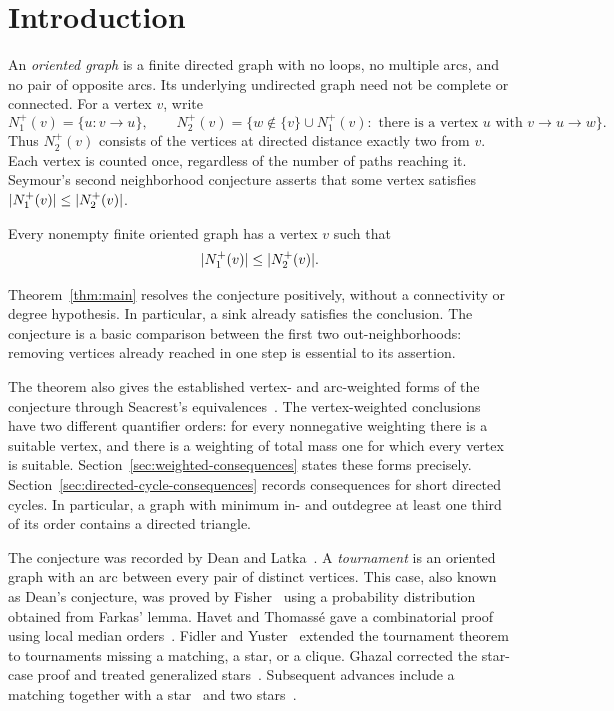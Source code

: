 \section{Introduction}\label{sec:introduction}

An \emph{oriented graph} is a finite directed graph with no loops, no multiple
arcs, and no pair of opposite arcs.  Its underlying undirected graph need
not be complete or connected.  For a vertex \(v\), write
\[
 N_1^+(v)=\{u:v\to u\},\qquad
 N_2^+(v)=\{w\notin\{v\}\cup N_1^+(v):
                 \text{ there is a vertex }u\text{ with }v\to u\to w\}.
\]
Thus \(N_2^+(v)\) consists of the vertices at directed distance exactly two
from \(v\).  Each vertex is counted once, regardless of the number of paths
reaching it.  Seymour's second neighborhood conjecture asserts that some
vertex satisfies \(\lvert N_1^+(v)\rvert\leq\lvert N_2^+(v)\rvert\).

\begin{theorem}\label{thm:main}
Every nonempty finite oriented graph has a vertex \(v\) such that
\[
 \lvert N_1^+(v)\rvert\leq \lvert N_2^+(v)\rvert.
\]
\end{theorem}

Theorem~\ref{thm:main} resolves the conjecture positively, without a
connectivity or degree hypothesis.  In particular, a sink already satisfies
the conclusion.  The conjecture is a basic comparison between the first two
out-neighborhoods: removing vertices already reached in one step is essential
to its assertion.

The theorem also gives the established vertex- and arc-weighted forms of
the conjecture through Seacrest's equivalences~\cite{Seacrest2015}.
The vertex-weighted conclusions have two different quantifier orders:
for every nonnegative weighting there is a suitable vertex, and there is
a weighting of total mass one for which every vertex is suitable.
Section~\ref{sec:weighted-consequences} states these forms precisely.
Section~\ref{sec:directed-cycle-consequences} records consequences for
short directed cycles.  In particular, a graph with minimum in- and
outdegree at least one third of its order contains a directed triangle.

The conjecture was recorded by Dean and Latka~\cite{DeanLatka1995}.
A \emph{tournament} is an oriented graph with an arc between every pair of
distinct vertices.  This case, also known as Dean's conjecture, was proved
by Fisher~\cite{Fisher1996} using a probability distribution obtained from
Farkas' lemma.  Havet and Thomass\'e gave a combinatorial proof using
local median orders~\cite{HavetThomasse2000}.  Fidler and
Yuster~\cite{FidlerYuster2007} extended the tournament theorem to
tournaments missing a matching, a star, or a clique.  Ghazal corrected the
star-case proof and treated generalized stars~\cite{Ghazal2012}.
Subsequent advances include a matching together with a
star~\cite{DaraFrancisJacobNarayanan2022} and two
stars~\cite{DaamouchAlMninyGhazal2025}.

